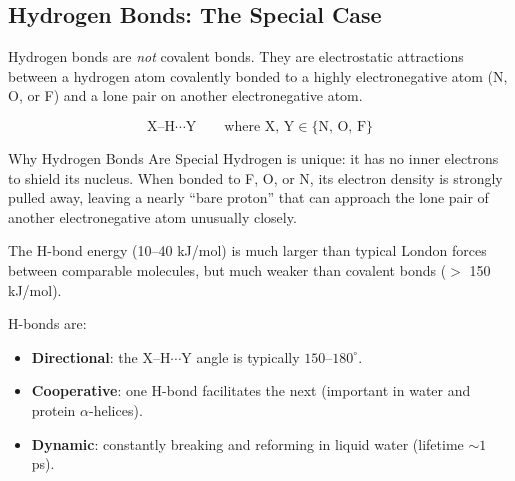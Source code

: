 \documentclass[12pt, a4paper]{book}
\begin{document}
\subsection{Hydrogen Bonds: The Special Case}

Hydrogen bonds are \emph{not} covalent bonds.
They are electrostatic attractions between a hydrogen atom
covalently bonded to a highly electronegative atom
(N, O, or F) and a lone pair on another electronegative atom.

\[
  \text{X--H} \cdots \text{Y}
  \qquad
  \text{where X, Y} \in \{\text{N, O, F}\}
\]

\begin{namedconcept}{Why Hydrogen Bonds Are Special}
Hydrogen is unique: it has no inner electrons to shield
its nucleus.
When bonded to F, O, or N, its electron density is strongly
pulled away, leaving a nearly ``bare proton'' that can
approach the lone pair of another electronegative atom
unusually closely.

The H-bond energy (10--40 kJ/mol) is much larger than
typical London forces between comparable molecules,
but much weaker than covalent bonds ($>$ 150 kJ/mol).

H-bonds are:
\begin{itemize}[nosep, leftmargin=2em]
  \item \textbf{Directional}: the X--H$\cdots$Y angle is
        typically $150$--$180^\circ$.
  \item \textbf{Cooperative}: one H-bond facilitates the
        next (important in water and protein $\alpha$-helices).
  \item \textbf{Dynamic}: constantly breaking and reforming
        in liquid water (lifetime $\sim 1$ ps).
\end{itemize}
\end{namedconcept}
\end{document}

